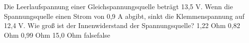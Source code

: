     {Die Leerlaufspannung einer Gleichspannungsquelle beträgt 13,5 V. Wenn die Spannungsquelle einen Strom von 0,9 A abgibt, sinkt die Klemmenspannung auf 12,4 V. Wie groß ist der Innenwiderstand der Spannungsquelle?}
    {1,22 Ohm}
    {0,82 Ohm}
    {0,99 Ohm}
    {15,0 Ohm}
    {false}{false}